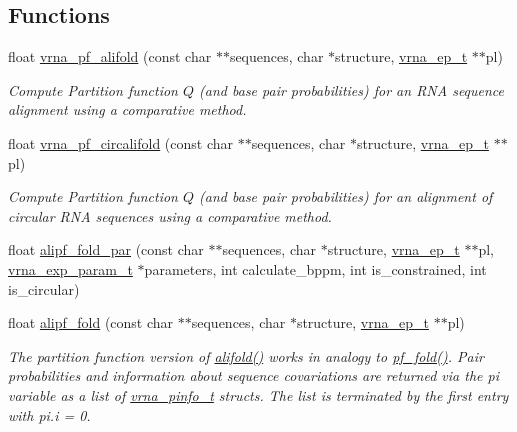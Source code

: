 \subsection*{Functions}
\begin{DoxyCompactItemize}
\item 
float \mbox{\hyperlink{group__consensus__pf__fold_ga374e31a0f326b2c5da5b84e143a63f38}{vrna\+\_\+pf\+\_\+alifold}} (const char $\ast$$\ast$sequences, char $\ast$structure, \mbox{\hyperlink{group__struct__utils_gab9ac98ab55ded9fb90043b024b915aca}{vrna\+\_\+ep\+\_\+t}} $\ast$$\ast$pl)
\begin{DoxyCompactList}\small\item\em Compute Partition function $Q$ (and base pair probabilities) for an R\+NA sequence alignment using a comparative method. \end{DoxyCompactList}\item 
float \mbox{\hyperlink{group__consensus__pf__fold_gab70fe6c9a78b79cc5669881720926e1d}{vrna\+\_\+pf\+\_\+circalifold}} (const char $\ast$$\ast$sequences, char $\ast$structure, \mbox{\hyperlink{group__struct__utils_gab9ac98ab55ded9fb90043b024b915aca}{vrna\+\_\+ep\+\_\+t}} $\ast$$\ast$pl)
\begin{DoxyCompactList}\small\item\em Compute Partition function $Q$ (and base pair probabilities) for an alignment of circular R\+NA sequences using a comparative method. \end{DoxyCompactList}\item 
float \mbox{\hyperlink{group__consensus__pf__fold_gab46954fb0ed3b6d5631e7f9b802978cd}{alipf\+\_\+fold\+\_\+par}} (const char $\ast$$\ast$sequences, char $\ast$structure, \mbox{\hyperlink{group__struct__utils_gab9ac98ab55ded9fb90043b024b915aca}{vrna\+\_\+ep\+\_\+t}} $\ast$$\ast$pl, \mbox{\hyperlink{group__energy__parameters_ga01d8b92fe734df8d79a6169482c7d8d8}{vrna\+\_\+exp\+\_\+param\+\_\+t}} $\ast$parameters, int calculate\+\_\+bppm, int is\+\_\+constrained, int is\+\_\+circular)
\item 
float \mbox{\hyperlink{group__consensus__pf__fold_ga1a5f6cfb9d761fa862ce4edc7c369cd2}{alipf\+\_\+fold}} (const char $\ast$$\ast$sequences, char $\ast$structure, \mbox{\hyperlink{group__struct__utils_gab9ac98ab55ded9fb90043b024b915aca}{vrna\+\_\+ep\+\_\+t}} $\ast$$\ast$pl)
\begin{DoxyCompactList}\small\item\em The partition function version of \mbox{\hyperlink{group__consensus__mfe__fold_ga4cf00f0659e5f0480335d69e797f05b1}{alifold()}} works in analogy to \mbox{\hyperlink{group__pf__fold_gadc3db3d98742427e7001a7fd36ef28c2}{pf\+\_\+fold()}}. Pair probabilities and information about sequence covariations are returned via the \textquotesingle{}pi\textquotesingle{} variable as a list of \mbox{\hyperlink{group__aln__utils_ga6660dfca23debee7306e0cd53341263f}{vrna\+\_\+pinfo\+\_\+t}} structs. The list is terminated by the first entry with pi.\+i = 0. \end{DoxyCompactList}\item 

\end{DoxyCompactItemize}
